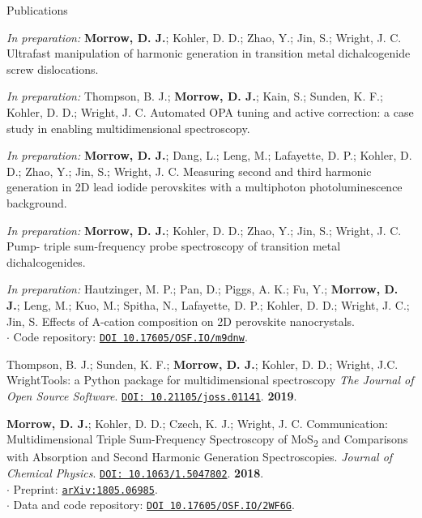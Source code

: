 \documentclass{resume} %
\begin{document}
\begin{rSection}{Publications}
	
\begin{etaremune}
	
\item[] \textit{In preparation:} \textbf{Morrow, D. J.}; Kohler, D. D.; Zhao, Y.; Jin, S.; Wright, J. C.	Ultrafast manipulation of harmonic generation in transition metal dichalcogenide screw dislocations.
	
	
\item[]  \textit{In preparation:} Thompson, B. J.;  \textbf{Morrow, D. J.}; Kain, S.; Sunden, K. F.; Kohler, D. D.;  Wright, J. C.	Automated OPA tuning and active correction: a case study in enabling multidimensional spectroscopy.

\item[] \textit{In preparation:} \textbf{Morrow, D. J.}; Dang, L.; Leng, M.; Lafayette, D. P.; Kohler, D. D.; Zhao, Y.; Jin, S.; Wright, J. C. Measuring second and third harmonic generation in 2D lead iodide perovskites with a multiphoton photoluminescence background.
	
\item[] \textit{In preparation:} \textbf{Morrow, D. J.}; Kohler, D. D.; Zhao, Y.; Jin, S.; Wright, J. C. Pump- triple sum-frequency probe spectroscopy of transition metal dichalcogenides.

\item[] \textit{In preparation:} Hautzinger, M. P.; Pan, D.; Piggs, A. K.; Fu, Y.; \textbf{Morrow, D. J.}; Leng, M.; Kuo, M.; Spitha, N., Lafayette, D. P.; Kohler, D. D.; Wright, J. C.; Jin, S. Effects of A-cation composition on 2D perovskite nanocrystals. \\
$\cdot$ Code repository: \href{https://osf.io/m9dnw/}{\texttt{DOI 10.17605/OSF.IO/m9dnw}}.


\item Thompson, B. J.; Sunden, K. F.; \textbf{Morrow, D. J.}; Kohler, D. D.; Wright, J.C. 
WrightTools: a Python package for multidimensional spectroscopy \emph{The Journal of Open Source Software}. 
\href{http://doi.org/10.21105/joss.01141}{\texttt{DOI: 10.21105/joss.01141}}. \textbf{2019}.
	
\item \textbf{Morrow, D. J.}; Kohler, D. D.; Czech, K. J.; Wright, J. C. 
Communication: Multidimensional Triple Sum-Frequency Spectroscopy of MoS\textsubscript{2} and Comparisons with Absorption and Second Harmonic Generation Spectroscopies. \emph{Journal of Chemical Physics}. \href{http://doi.org/10.1063/1.5047802}{\texttt{DOI: 10.1063/1.5047802}}. \textbf{2018}.\\
$\cdot$ Preprint: \href{http://arxiv.org/abs/1805.06985}{\texttt{arXiv:1805.06985}}. \\
$\cdot$ Data and code repository: \href{https://osf.io/2wf6g/}{\texttt{DOI 10.17605/OSF.IO/2WF6G}}.
	

\end{etaremune}
\end{rSection}
\end{document}
